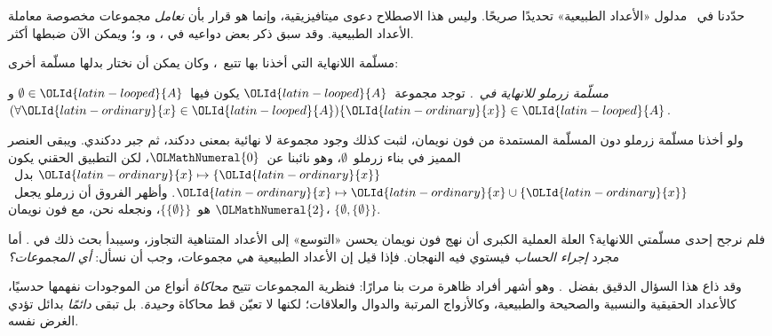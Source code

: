\documentclass[../../../include/open-logic-section]{subfiles}
\begin{document}
	


حدّدنا في~ مدلول «الأعداد الطبيعية»
تحديدًا صريحًا. وليس هذا الاصطلاح دعوى ميتافيزيقية، وإنما هو قرار بأن
\emph{نعامل} مجموعات مخصوصة معاملة الأعداد الطبيعية. وقد سبق ذكر بعض
دواعيه في
، و،
و؛ ويمكن الآن ضبطها أكثر.

مسلّمة اللانهاية التي أخذنا بها تتبع~\citet{VonNeumann1925}، وكان
يمكن أن نختار بدلها مسلّمة أخرى:

\begin{defish}
\emph{مسلّمة زرملو للانهاية في~\citeyear{Zermelo1908Untersuchungen}.}
توجد مجموعة~$\OLId{latin-looped}{A}$ يكون فيها~$\emptyset \in \OLId{latin-looped}{A}$ و
$(\forall \OLId{latin-ordinary}{x} \in \OLId{latin-looped}{A})\{\OLId{latin-ordinary}{x}\} \in \OLId{latin-looped}{A}$.
\end{defish}

ولو أخذنا مسلّمة زرملو دون المسلّمة المستمدة من فون نويمان، لثبت كذلك
وجود مجموعة لا نهائية بمعنى ددكند، ثم جبر ددكندي. ويبقى العنصر المميز
في بناء زرملو~$\emptyset$، وهو نائبنا عن~$\OLMathNumeral{0}$، لكن التطبيق الحقني يكون
$\OLId{latin-ordinary}{x} \mapsto \{\OLId{latin-ordinary}{x}\}$ بدل~$\OLId{latin-ordinary}{x} \mapsto \OLId{latin-ordinary}{x} \cup \{\OLId{latin-ordinary}{x}\}$. وأظهر الفروق أن
زرملو يجعل~$\OLMathNumeral{2}$ هو~$\{\{\emptyset\}\}$، ونجعله نحن، مع فون نويمان،
$\{\emptyset, \{\emptyset\}\}$.

فلم نرجح إحدى مسلّمتي اللانهاية؟ العلة العملية الكبرى أن نهج فون
نويمان يحسن «التوسع» إلى الأعداد المتناهية التجاوز، وسيبدأ بحث ذلك في
. أما مجرد \emph{إجراء الحساب} فيستوي فيه
النهجان. فإذا قيل إن الأعداد الطبيعية \emph{هي} مجموعات، وجب أن نسأل:
\emph{أي المجموعات؟}

وقد ذاع هذا السؤال الدقيق بفضل~\citet{Benacerraf1965}. وهو أشهر أفراد
ظاهرة مرت بنا مرارًا: فنظرية المجموعات تتيح \emph{محاكاة} أنواع من
الموجودات نفهمها حدسيًا، كالأعداد الحقيقية والنسبية والصحيحة والطبيعية،
وكالأزواج المرتبة والدوال والعلاقات؛ لكنها لا تعيّن قط محاكاة
\emph{وحيدة}. بل تبقى \emph{دائمًا} بدائل تؤدي الغرض نفسه.
\end{document}
